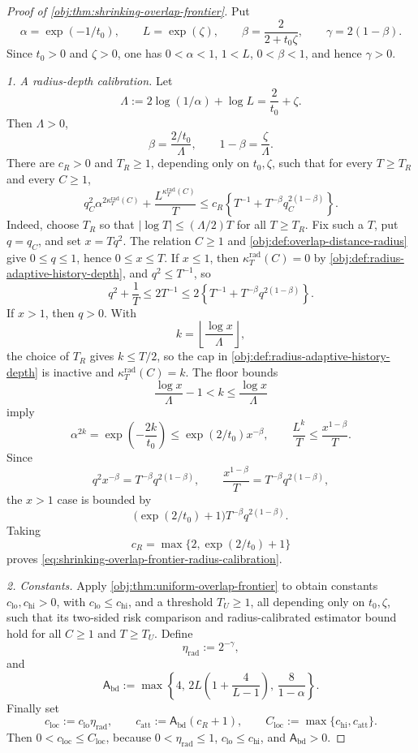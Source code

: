 \begin{proof}[Proof of \cref{obj:thm:shrinking-overlap-frontier}]
Put
\[
\alpha=\exp(-1/t_0),\qquad L=\exp(\zeta),\qquad
\beta=\frac{2}{2+t_0\zeta},\qquad
\gamma=2(1-\beta).
\]
Since \(t_0>0\) and \(\zeta>0\), one has \(0<\alpha<1\), \(1<L\),
\(0<\beta<1\), and hence \(\gamma>0\).

\emph{1. A radius-depth calibration.}
Let
\[
\Lambda:=2\log(1/\alpha)+\log L=\frac{2}{t_0}+\zeta .
\]
Then \(\Lambda>0\),
\[
\beta=\frac{2/t_0}{\Lambda},
\qquad
1-\beta=\frac{\zeta}{\Lambda}.
\]
There are \(c_R>0\) and \(T_R\ge1\), depending only on \(t_0,\zeta\), such that for every \(T\ge T_R\) and every \(C\ge1\),
\begin{equation}\label{eq:shrinking-overlap-frontier-radius-calibration}
q_C^2\alpha^{2\kappa_T^{\mathrm{rad}}(C)}
+\frac{L^{\kappa_T^{\mathrm{rad}}(C)}}{T}
\le
c_R\left\{
T^{-1}+T^{-\beta}q_C^{2(1-\beta)}
\right\}.
\end{equation}
Indeed, choose \(T_R\) so that \(|\log T|\le(\Lambda/2)T\) for all
\(T\ge T_R\).  Fix such a \(T\), put \(q=q_C\), and set \(x=Tq^2\).
The relation \(C\ge1\) and \cref{obj:def:overlap-distance-radius} give
\(0\le q\le1\), hence \(0\le x\le T\).  If \(x\le1\), then
\(\kappa_T^{\mathrm{rad}}(C)=0\) by \cref{obj:def:radius-adaptive-history-depth}, and
\(q^2\le T^{-1}\), so
\[
q^2+\frac1T
\le 2T^{-1}
\le
2\left\{T^{-1}+T^{-\beta}q^{2(1-\beta)}\right\}.
\]
If \(x>1\), then \(q>0\).  With
\[
k=\left\lfloor\frac{\log x}{\Lambda}\right\rfloor ,
\]
the choice of \(T_R\) gives \(k\le T/2\), so the cap in
\cref{obj:def:radius-adaptive-history-depth} is inactive and
\(\kappa_T^{\mathrm{rad}}(C)=k\).  The floor bounds
\[
\frac{\log x}{\Lambda}-1<k\le\frac{\log x}{\Lambda}
\]
imply
\[
\alpha^{2k}
=\exp\!\left(-\frac{2k}{t_0}\right)
\le
\exp(2/t_0)x^{-\beta},
\qquad
\frac{L^k}{T}
\le
\frac{x^{1-\beta}}{T}.
\]
Since
\[
q^2x^{-\beta}
=
T^{-\beta}q^{2(1-\beta)},
\qquad
\frac{x^{1-\beta}}{T}
=
T^{-\beta}q^{2(1-\beta)},
\]
the \(x>1\) case is bounded by
\[
\bigl(\exp(2/t_0)+1\bigr)T^{-\beta}q^{2(1-\beta)}.
\]
Taking
\[
c_R=\max\{2,\exp(2/t_0)+1\}
\]
proves \cref{eq:shrinking-overlap-frontier-radius-calibration}. %

\emph{2. Constants.}
Apply \cref{obj:thm:uniform-overlap-frontier} to obtain constants
\(c_{\mathrm{lo}},c_{\mathrm{hi}}>0\), with
\(c_{\mathrm{lo}}\le c_{\mathrm{hi}}\), and a threshold \(T_U\ge1\), all
depending only on \(t_0,\zeta\), such that its two-sided risk comparison and
radius-calibrated estimator bound hold for all \(C\ge1\) and \(T\ge T_U\).
Define
\[
\eta_{\mathrm{rad}}:=2^{-\gamma},
\]
and
\[
\mathsf A_{\mathrm{bd}}
:=
\max\left\{
4,\,
2L\left(1+\frac{4}{L-1}\right),\,
\frac{8}{1-\alpha}
\right\}.
\]
Finally set
\[
c_{\mathrm{loc}}:=c_{\mathrm{lo}}\eta_{\mathrm{rad}},
\qquad
c_{\mathrm{att}}:=\mathsf A_{\mathrm{bd}}(c_R+1),
\qquad
C_{\mathrm{loc}}:=\max\{c_{\mathrm{hi}},c_{\mathrm{att}}\}.
\]
Then \(0<c_{\mathrm{loc}}\le C_{\mathrm{loc}}\), because
\(0<\eta_{\mathrm{rad}}\le1\), \(c_{\mathrm{lo}}\le c_{\mathrm{hi}}\), and
\(\mathsf A_{\mathrm{bd}}>0\). %


\end{proof}
